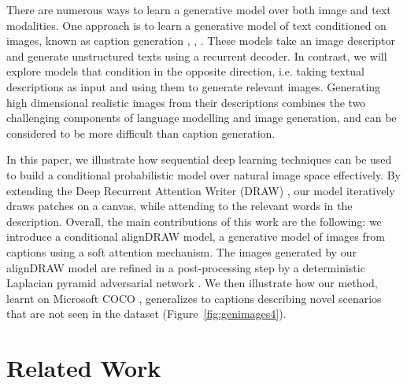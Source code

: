 \documentclass{article} %
\begin{document}
There are numerous ways to learn a generative model over both image and text modalities. One approach is to learn a generative model of text conditioned on images, known as caption generation
\citep{karpathy_captions}, \citep{vinyals_captions}, \citep{xu_captions}. These models take an image descriptor and generate unstructured texts using a recurrent decoder. In contrast, we will explore models that condition in the opposite direction, i.e. taking textual descriptions as input and using them to generate relevant images.
Generating high dimensional realistic images from their descriptions 
combines the two challenging components of language modelling and image generation, and can be considered to be more difficult than caption generation. %

In this paper, we illustrate how sequential deep learning techniques can be used to build a conditional probabilistic model over natural image space effectively. By extending the Deep Recurrent Attention Writer (DRAW) \citep{gregor_draw}, our model iteratively draws patches on a canvas, while attending to the relevant words in the description. Overall, the main contributions of this work are the following: we introduce a conditional alignDRAW model, a generative model of images from captions using a soft attention mechanism. The images generated by our alignDRAW model are refined in a post-processing step by a deterministic Laplacian pyramid adversarial network \citep{denton_lapgan}. We then illustrate how our method, learnt on Microsoft COCO \citep{mscoco}, generalizes to captions describing novel scenarios that are not seen in the dataset (Figure~\ref{fig:genimages4}). 

\section{Related Work}
\end{document}
